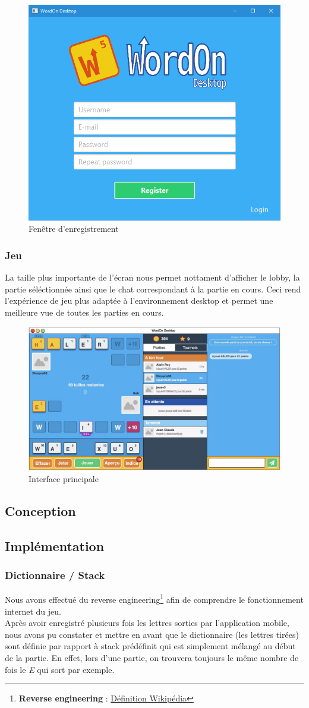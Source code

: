 \documentclass[a4paper,12pt]{article}
\begin{document}
		\begin{figure}[h]
			\centering
			\includegraphics[width=0.4\linewidth]{img/signup.jpg}
			\caption{Fenêtre d'enregistrement}
		\end{figure}
		
		\subsubsection{Jeu}
		La taille plus importante de l'écran nous permet nottament d'afficher le lobby, la partie séléctionnée ainsi que le chat correspondant à la partie en cours. Ceci rend l'expérience de jeu plus adaptée à l'environnement desktop et permet une meilleure vue de toutes les parties en cours.
		
		\begin{figure}[h]
			\centering
			\includegraphics[width=0.6\linewidth]{img/main.jpg}
			\caption{Interface principale}
		\end{figure}
		
	\subsection{Conception}
	
	\subsection{Implémentation}
		\subsubsection{Dictionnaire / Stack}
		Nous avons effectué du reverse engineering\footnote{\textbf{Reverse engineering} :  \href{https://fr.wikipedia.org/wiki/R\%C3\%A9tro-ing\%C3\%A9nierie}{Définition Wikipédia}} afin de comprendre le fonctionnement internet du jeu.\\
		Après avoir enregistré plusieurs fois les lettres sorties par l'application mobile, nous avons pu constater et mettre en avant que le dictionnaire (les lettres tirées) sont définie par rapport à stack prédéfinit qui est simplement mélangé au début de la partie. En effet, lors d'une partie, on trouvera toujours le même nombre de fois le \textit{E} qui sort par exemple.
		
\end{document}
